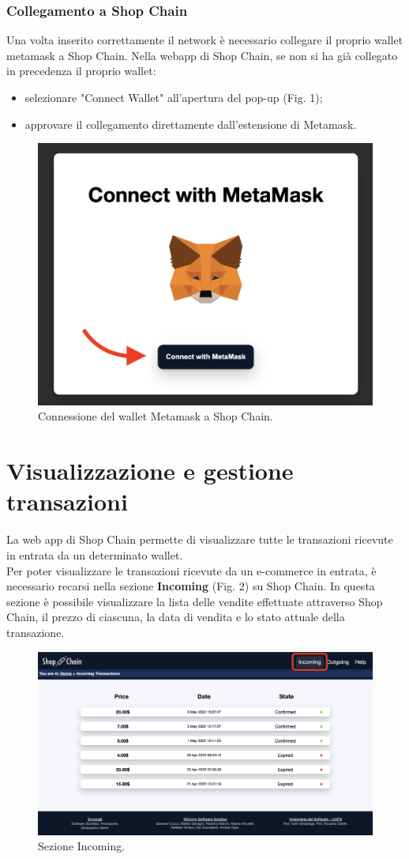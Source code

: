 \documentclass[a4paper, 12pt]{article}
\begin{document}
\subsubsection{Collegamento a Shop Chain}
Una volta inserito correttamente il network è necessario collegare il proprio wallet metamask a Shop Chain. Nella webapp di Shop Chain, se non si ha già collegato in precedenza il proprio wallet:
\begin {itemize}
\item selezionare "Connect Wallet" all'apertura del pop-up (Fig. 1);
\item approvare il collegamento direttamente dall'estensione di Metamask.
\end{itemize}

\FloatBarrier
\begin{figure}[!h]
\centering
\includegraphics[width=0.5\linewidth]{img/connessione_wallet.png}
\caption{Connessione del wallet Metamask a Shop Chain.}
\end{figure}
\FloatBarrier

\section{Visualizzazione e gestione transazioni}
La web app di Shop Chain permette di visualizzare tutte le transazioni ricevute in entrata da un determinato wallet.\\
Per poter visualizzare le transazioni ricevute da un e-commerce in entrata, è necessario recarsi nella sezione \textbf{Incoming} (Fig. 2) su Shop Chain. In questa sezione è possibile visualizzare la lista delle vendite effettuate attraverso Shop Chain, il prezzo di ciascuna, la data di vendita e lo stato attuale della transazione.
\FloatBarrier
\begin{figure}[!h]
\centering
\includegraphics[width=0.8\linewidth]{img/incoming.png}
\caption{Sezione Incoming.}
\end{figure}
\FloatBarrier
\end{document}

